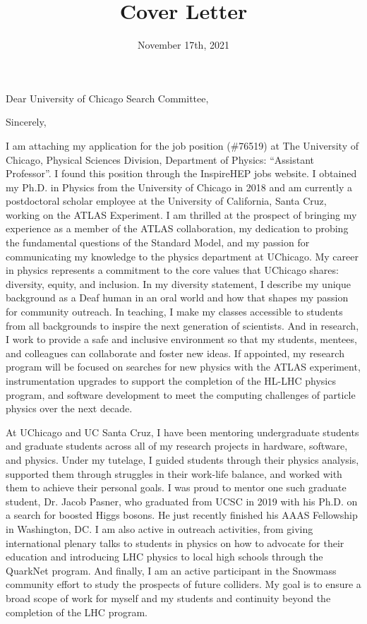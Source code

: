 \documentclass[10pt,letterpaper,sans]{moderncv/moderncv} %
\title{Cover Letter}
\begin{document}
\date{November 17th, 2021}
\opening{Dear University of Chicago Search Committee,}
\closing{Sincerely,}

\makelettertitle
\vspace*{-1em}

I am attaching my application for the job position (\#76519) at The University of Chicago, Physical Sciences Division, Department of Physics: ``Assistant Professor''. I found this position through the InspireHEP jobs website. I obtained my Ph.D. in Physics from the University of Chicago in 2018 and am currently a postdoctoral scholar employee at the University of California, Santa Cruz, working on the ATLAS Experiment. I am thrilled at the prospect of bringing my experience as a member of the ATLAS collaboration, my dedication to probing the fundamental questions of the Standard Model, and my passion for communicating my knowledge to the physics department at UChicago. My career in physics represents a commitment to the core values that UChicago shares: diversity, equity, and inclusion. In my diversity statement, I describe my unique background as a Deaf human in an oral world and how that shapes my passion for community outreach. In teaching, I make my classes accessible to students from all backgrounds to inspire the next generation of scientists. And in research, I work to provide a safe and inclusive environment so that my students, mentees, and colleagues can collaborate and foster new ideas. If appointed, my research program will be focused on searches for new physics with the ATLAS experiment, instrumentation upgrades to support the completion of the HL-LHC physics program, and software development to meet the computing challenges of particle physics over the next decade.

At UChicago and UC Santa Cruz, I have been mentoring undergraduate students and graduate students across all of my research projects in hardware, software, and physics. Under my tutelage, I guided students through their physics analysis, supported them through struggles in their work-life balance, and worked with them to achieve their personal goals. I was proud to mentor one such graduate student, Dr. Jacob Pasner, who graduated from UCSC in 2019 with his Ph.D. on a search for boosted Higgs bosons. He just recently finished his AAAS Fellowship in Washington, DC. I am also active in outreach activities, from giving international plenary talks to students in physics on how to advocate for their education and introducing LHC physics to local high schools through the QuarkNet program. And finally, I am an active participant in the Snowmass community effort to study the prospects of future colliders. My goal is to ensure a broad scope of work for myself and my students and continuity beyond the completion of the LHC program.
\end{document}
